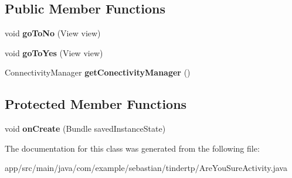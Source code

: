 \subsection*{Public Member Functions}
\begin{DoxyCompactItemize}
\item 
void {\bfseries go\+To\+No} (View view)\hypertarget{classcom_1_1example_1_1sebastian_1_1tindertp_1_1AreYouSureActivity_addbc55b02c35a1a6f926dfc4056c6072}{}\label{classcom_1_1example_1_1sebastian_1_1tindertp_1_1AreYouSureActivity_addbc55b02c35a1a6f926dfc4056c6072}

\item 
void {\bfseries go\+To\+Yes} (View view)\hypertarget{classcom_1_1example_1_1sebastian_1_1tindertp_1_1AreYouSureActivity_a18252af772c972d11483880dcd6327ee}{}\label{classcom_1_1example_1_1sebastian_1_1tindertp_1_1AreYouSureActivity_a18252af772c972d11483880dcd6327ee}

\item 
Connectivity\+Manager {\bfseries get\+Conectivity\+Manager} ()\hypertarget{classcom_1_1example_1_1sebastian_1_1tindertp_1_1AreYouSureActivity_ad6f811ed896ab2a9645375b117d62503}{}\label{classcom_1_1example_1_1sebastian_1_1tindertp_1_1AreYouSureActivity_ad6f811ed896ab2a9645375b117d62503}

\end{DoxyCompactItemize}
\subsection*{Protected Member Functions}
\begin{DoxyCompactItemize}
\item 
void {\bfseries on\+Create} (Bundle saved\+Instance\+State)\hypertarget{classcom_1_1example_1_1sebastian_1_1tindertp_1_1AreYouSureActivity_ae86d975c4bede1d00f6190c446f61991}{}\label{classcom_1_1example_1_1sebastian_1_1tindertp_1_1AreYouSureActivity_ae86d975c4bede1d00f6190c446f61991}

\end{DoxyCompactItemize}


The documentation for this class was generated from the following file\+:\begin{DoxyCompactItemize}
\item 
app/src/main/java/com/example/sebastian/tindertp/Are\+You\+Sure\+Activity.\+java\end{DoxyCompactItemize}
